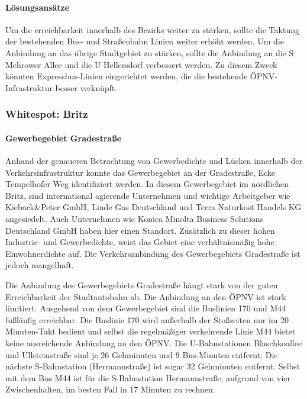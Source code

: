 \paragraph{Lösungsansätze}
Um die erreichbarkeit innerhalb des Bezirks weiter zu stärken, sollte die Taktung der bestehenden Bus- und Straßenbahn Linien weiter erhöht werden. Um die Anbindung an das übrige Stadtgebiet zu stärken, sollte die Anbindung an die S Mehrower Allee und die U Hellersdorf verbessert werden. Zu diesem Zweck könnten Expressbus-Linien eingerichtet werden, die die bestehende ÖPNV-Infrastruktur besser verknüpft.








\subsubsection{Whitespot: Britz}
\paragraph{Gewerbegebiet Gradestraße}
Anhand der genaueren Betrachtung von Gewerbedichte und Lücken innerhalb der Verkehrsinfrastruktur konnte das Gewerbegebiet an der Gradestraße, Ecke Tempelhofer Weg identifiziert werden. In diesem Gewerbegebiet im nördlichen Britz, sind international agierende Unternehmen und wichtige Arbeitgeber wie Kieback\&Peter GmbH, Linde Gas Deutschland und Terra Naturkost Handels KG angesiedelt. Auch Unternehmen wie Konica Minolta Business Solutions Deutschland GmbH haben hier einen Standort. Zusätzlich zu dieser hohen Industrie- und Gewerbedichte, weist das Gebiet eine verhältnismäßig hohe Einwohnerdichte auf. Die Verkehrsanbindung des Gewerbegebiets Gradestraße ist jedoch mangelhaft.

Die Anbindung des Gewerbegebiets Gradestraße hängt stark von der guten Erreichbarkeit der Stadtautobahn ab. Die Anbindung an den ÖPNV ist stark limitiert. Ausgehend von dem Gewerbegebiet sind die Buslinien 170 und M44 fußläufig erreichbar. Die Buslinie 170 wird außerhalb der Stoßzeiten nur im 20 Minuten-Takt bedient und selbst die regelmäßiger verkehrende Linie M44 bietet keine ausreichende Anbindung an den ÖPNV. Die U-Bahnstationen Blaschkoallee und Ullsteinstraße sind je 26 Gehminuten und 9 Bus-Minuten entfernt. Die nächste S-Bahnstation (Hermannstraße) ist sogar 32 Gehminuten entfernt. Selbst mit dem Bus M44 ist für die S-Bahnstation Hermannstraße, aufgrund von vier Zwischenhalten, im besten Fall in 17 Minuten zu rechnen.

